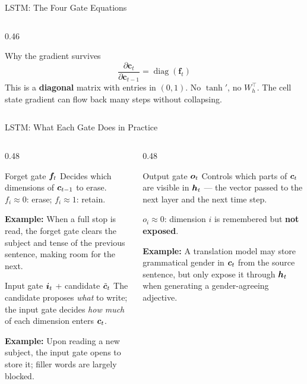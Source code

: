 \documentclass[aspectratio=169]{beamer}
\begin{document}
\begin{frame}{LSTM: The Four Gate Equations}
\begin{columns}[T]
\begin{column}{0.46\textwidth}
\begin{alertblock}{Why the gradient survives}
\[
\frac{\partial \bm{c}_t}{\partial \bm{c}_{t-1}} = \operatorname{diag}(\bm{f}_t)
\]
This is a \textbf{diagonal} matrix with entries in $(0,1)$.
No $\tanh'$, no $W_h^{\top}$.
The cell state gradient can flow back many steps
without collapsing.
\end{alertblock}

\end{column}
\end{columns}
\end{frame}
%
%
\begin{frame}{LSTM: What Each Gate Does in Practice}

\small
\begin{columns}[T]
\begin{column}{0.48\textwidth}

\begin{block}{Forget gate $\bm{f}_t$}
Decides which dimensions of $\bm{c}_{t-1}$ to erase.
$f_i \approx 0$: erase; $f_i \approx 1$: retain.

\smallskip
\textbf{Example:} When a full stop is read, the forget gate clears
the subject and tense of the previous sentence, making room for the next.
\end{block}

\smallskip

\begin{block}{Input gate $\bm{i}_t$ + candidate $\tilde{\bm{c}}_t$}
The candidate proposes \emph{what} to write; the input gate decides
\emph{how much} of each dimension enters $\bm{c}_t$.

\smallskip
\textbf{Example:} Upon reading a new subject, the input gate opens
to store it; filler words are largely blocked.
\end{block}

\end{column}
\begin{column}{0.48\textwidth}

\begin{block}{Output gate $\bm{o}_t$}
Controls which parts of $\bm{c}_t$ are visible in $\bm{h}_t$
--- the vector passed to the next layer and the next time step.

$o_i \approx 0$: dimension $i$ is remembered but \textbf{not exposed}.

\smallskip
\textbf{Example:} A translation model may store grammatical gender
in $\bm{c}_t$ from the source sentence, but only expose it through
$\bm{h}_t$ when generating a gender-agreeing adjective.
\end{block}


\end{column}
\end{columns}
\end{frame}
\end{document}
